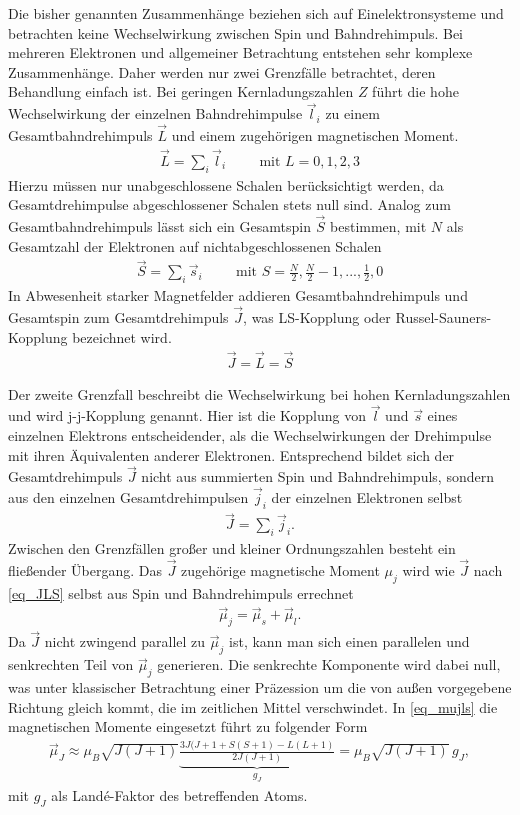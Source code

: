 Die bisher genannten Zusammenhänge beziehen sich auf Einelektronsysteme und betrachten keine Wechselwirkung zwischen Spin und Bahndrehimpuls. Bei
mehreren Elektronen und allgemeiner Betrachtung entstehen sehr komplexe Zusammenhänge. Daher werden nur zwei Grenzfälle betrachtet, deren Behandlung
einfach ist. Bei geringen Kernladungszahlen $Z$ führt die hohe Wechselwirkung der einzelnen Bahndrehimpulse $\vec l_i$ zu einem Gesamtbahndrehimpuls $\vec L$
und einem zugehörigen magnetischen Moment.
\begin{align}
 \vec L = \sum_i \vec l_i\hspace{1cm} \text{mit } L=0,1,2,3
\end{align}
Hierzu müssen nur unabgeschlossene Schalen berücksichtigt werden, da Gesamtdrehimpulse abgeschlossener Schalen stets null sind. Analog zum Gesamtbahndrehimpuls
lässt sich ein Gesamtspin $\vec S$ bestimmen, mit $N$ als Gesamtzahl der Elektronen auf nichtabgeschlossenen Schalen
\begin{align}
 \vec S = \sum_i \vec s_i\hspace{1cm} \text{mit } S=\frac{N}{2}, \frac{N}{2}-1,..., \frac12,0
\end{align}
In Abwesenheit starker Magnetfelder addieren Gesamtbahndrehimpuls und Gesamtspin zum Gesamtdrehimpuls $\vec J$, was LS-Kopplung oder Russel-Sauners-Kopplung
bezeichnet wird.
\begin{align}
 \vec J = \vec L = \vec S
 \label{eq_JLS}
\end{align}

Der zweite Grenzfall beschreibt die Wechselwirkung bei hohen Kernladungszahlen und wird j-j-Kopplung genannt. Hier ist die Kopplung von $\vec l$
und $\vec s$ eines einzelnen Elektrons entscheidender, als die Wechselwirkungen der Drehimpulse mit ihren Äquivalenten anderer Elektronen. Entsprechend
bildet sich der Gesamtdrehimpuls $\vec J$ nicht aus summierten Spin und Bahndrehimpuls, sondern aus den einzelnen Gesamtdrehimpulsen $\vec j_i$ der einzelnen
Elektronen selbst
\begin{align}
 \vec J = \sum_i \vec j_i.
\end{align}
Zwischen den Grenzfällen großer und kleiner Ordnungszahlen besteht ein fließender Übergang. Das $\vec J$ zugehörige magnetische Moment $\mu_j$ 
wird wie $\vec J$ nach \eqref{eq_JLS} selbst aus Spin und Bahndrehimpuls errechnet
\begin{align}
 \vec \mu_j = \vec \mu_s + \vec \mu_l.
 \label{eq_mujls}
\end{align}
Da $\vec J$ nicht zwingend parallel zu $\vec \mu_j$ ist, kann man sich einen parallelen und senkrechten Teil von $\vec \mu_j$ generieren. Die 
senkrechte Komponente wird dabei null, was unter klassischer Betrachtung einer Präzession um die von außen vorgegebene Richtung gleich kommt, 
die im zeitlichen Mittel verschwindet. In \eqref{eq_mujls} die magnetischen Momente eingesetzt führt zu folgender Form
\begin{align}
 \vec \mu_J \approx \mu_B\sqrt{J(J+1)}\underbrace{\frac{3J(J+1+S(S+1)-L(L+1)}{2J(J+1)}}_{g_J} = \mu_B\sqrt{J(J+1)} \,g_J ,
 \label{eq_lande}
\end{align}
mit $g_J$ als Landé-Faktor des betreffenden Atoms.

